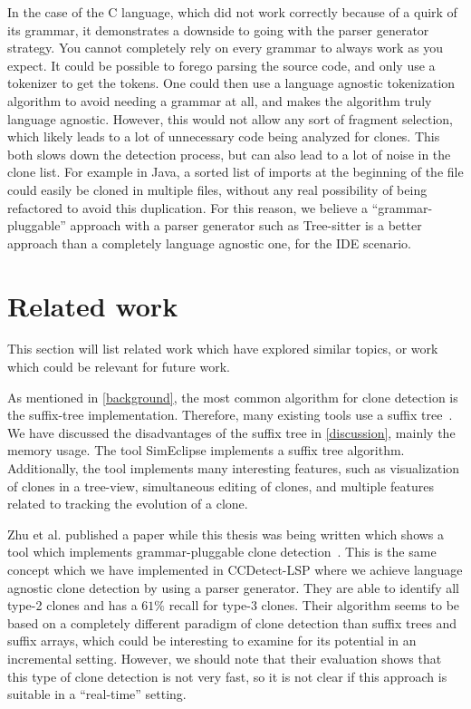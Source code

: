 In the case of the C language, which did not work correctly because of a quirk of its
grammar, it demonstrates a downside to going with the parser generator strategy. You
cannot completely rely on every grammar to always work as you expect. It could be possible
to forego parsing the source code, and only use a tokenizer to get the tokens. One could
then use a language agnostic tokenization algorithm to avoid needing a grammar at all, and
makes the algorithm truly language agnostic. However, this would not allow any sort of
fragment selection, which likely leads to a lot of unnecessary code being analyzed for
clones. This both slows down the detection process, but can also lead to a lot of noise in
the clone list. For example in Java, a sorted list of imports at the beginning of the file
could easily be cloned in multiple files, without any real possibility of being refactored
to avoid this duplication. For this reason, we believe a ``grammar-pluggable'' approach
with a parser generator such as Tree-sitter is a better approach than a completely
language agnostic one, for the IDE scenario.

\section{Related work}

This section will list related work which have explored similar topics, or work which
could be relevant for future work.

As mentioned in \cref{background}, the most common algorithm for clone detection is the
suffix-tree implementation. Therefore, many existing tools use a suffix
tree~\cite{GodeIncrementalCloneDetection, Zibran_real_time_search}. We have discussed the
disadvantages of the suffix tree in \cref{discussion}, mainly the memory usage. The tool
SimEclipse implements a suffix tree algorithm. Additionally, the tool implements many
interesting features, such as visualization of clones in a tree-view, simultaneous editing
of clones, and multiple features related to tracking the evolution of a clone.

Zhu et al. published a paper while this thesis was being written which shows a tool which
implements grammar-pluggable clone detection~\cite{GrammarPluggableCloneDetection}. This
is the same concept which we have implemented in CCDetect-LSP where we achieve language
agnostic clone detection by using a parser generator. They are able to identify all type-2
clones and has a $61\%$ recall for type-3 clones. Their algorithm seems to be based on a
completely different paradigm of clone detection than suffix trees and suffix arrays,
which could be interesting to examine for its potential in an incremental setting.
However, we should note that their evaluation shows that this type of clone detection is
not very fast, so it is not clear if this approach is suitable in a ``real-time'' setting.

